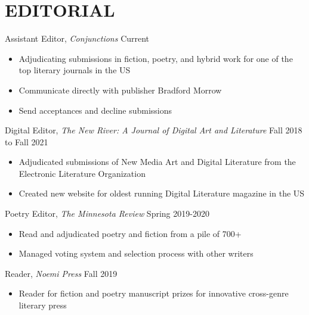 \section{EDITORIAL}

Assistant Editor, \emph{Conjunctions}
 \hfill Current \\
 \begin{itemize}
  \item Adjudicating submissions in fiction, poetry, and hybrid work for one of the top literary journals in the US
  \item Communicate directly with publisher Bradford Morrow
  \item Send acceptances and decline submissions 
 \end{itemize} 


Digital Editor, \emph{The New River: A Journal of Digital Art and Literature}
 \hfill Fall 2018 to Fall 2021 \\
 \begin{itemize}
  \item Adjudicated submissions of New Media Art and Digital Literature from the Electronic Literature Organization
 \item Created new website for oldest running Digital Literature magazine in the US\\
 \end{itemize} 
 
Poetry Editor,  \emph{The Minnesota Review}  \hfill Spring 2019-2020 \\
 \begin{itemize}
 \item  Read and adjudicated poetry and fiction from a pile of 700+
 \item Managed voting system and selection process with other writers
 \end{itemize}
 
Reader,  \emph{Noemi Press}  \hfill Fall 2019 \\
 \begin{itemize}
 \item Reader for fiction and poetry manuscript prizes for innovative cross-genre literary press
 \end{itemize}
 

